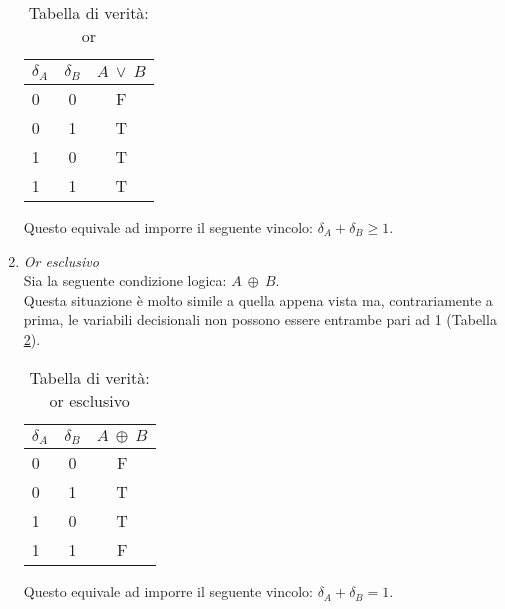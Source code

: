 \begin{enumerate}
\begin{table}[h!]
  \begin{center}
    \begin{tabular}{l|c|c} %
      $\delta_A$ & $\delta_B$ & $A~\vee~B$ \\
      \hline
      0 & 0 & F\\
      0 & 1 & T\\
      1 & 0 & T\\
      1 & 1 & T\\
    \end{tabular}
    \caption{Tabella di verità: or}
    \label{tab:tableOR}
  \end{center}
\end{table}

Questo equivale ad imporre il seguente vincolo: $\delta_A + \delta_B \geq 1$.

\item \textit{Or esclusivo}\\
Sia la seguente condizione logica: $A~\oplus~B$.\\
Questa situazione è molto simile a quella appena vista ma, contrariamente a prima, le variabili decisionali non possono essere entrambe pari ad 1 (Tabella \ref{tab:tableORe}).

\begin{table}[h!]
  \begin{center}
    \begin{tabular}{l|c|c} %
      $\delta_A$ & $\delta_B$ & $A~\oplus~B$ \\
      \hline
      0 & 0 & F\\
      0 & 1 & T\\
      1 & 0 & T\\
      1 & 1 & F\\
    \end{tabular}
    \caption{Tabella di verità: or esclusivo}
    \label{tab:tableORe}
  \end{center}
\end{table}

Questo equivale ad imporre il seguente vincolo: $\delta_A + \delta_B = 1$.


\end{enumerate}
